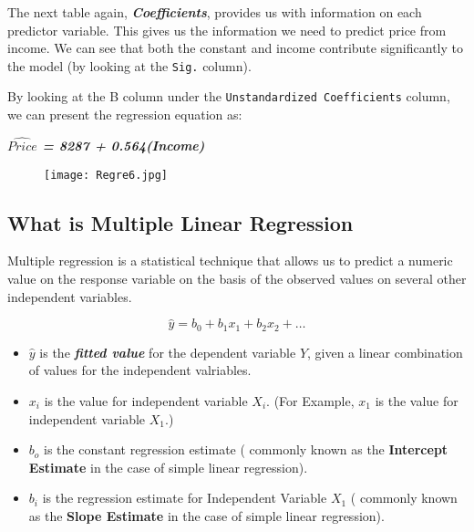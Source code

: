 \documentclass[a4paper,12pt]{article}
\begin{document}
The next table again, \textbf{\textit{Coefficients}}, provides us with information on each predictor variable. This gives us the information we need to predict price from income. We can see that both the constant and income contribute significantly to the model (by looking at the \texttt{Sig.} column). 

By looking at the B column under the \texttt{Unstandardized Coefficients} column, we can present the regression equation as:
\begin{center}
\textit{\textbf{ $\hat{Price}$ = 8287 + 0.564(Income)}}
\end{center}
\begin{figure}[h!]
\begin{centering}
  \texttt{[image: Regre6.jpg]}\\
\end{centering}
\end{figure}


\newpage

\subsection{What is Multiple Linear Regression}

Multiple regression is a statistical technique that allows us to predict a numeric value on the response variable on the basis of the observed values on several other independent variables.


\[\hat{y} = b_0 + b_1x_1 + b_2x_2 + \ldots \]

\begin{itemize}
	\item $\hat{y}$ is the \textbf{\textit{fitted value}} for the dependent variable \textbf{$Y$}, given a linear combination of values for the independent valriables.
	
	\item $x_i$ is the value for independent variable \textbf{$X_i$}. (For Example, $x_1$ is the value for independent variable \textbf{$X_1$}.)
	\item $b_o$ is the constant regression estimate ( commonly known as the \textbf{Intercept Estimate} in the case of simple linear regression).
	\item $b_i$ is the regression estimate for Independent Variable \textbf{$X_1$} ( commonly known as the \textbf{Slope Estimate} in the case of simple linear regression).
\end{itemize}
\end{document}
